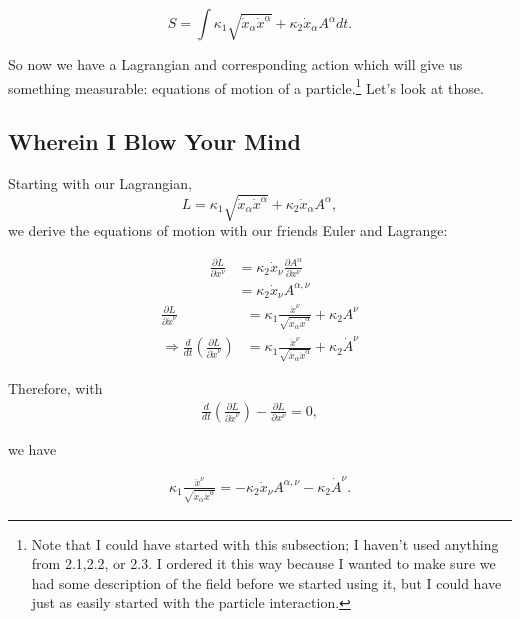 \documentclass[11pt]{article}
\begin{document}
\begin{equation}\label{eq:particle_act}
S = \int\kappa_1 \sqrt{\dot{x}_\alpha\dot{x}^\alpha} + \kappa_2 \dot{x}_\alpha A^\alpha dt.
\end{equation}

So now we have a Lagrangian and corresponding action which will give us something measurable: equations of motion of a particle.\footnote{Note that I could have started with this subsection; I haven't used anything from 2.1,2.2, or 2.3.  I ordered it this way because I wanted to make sure we had some description of the field before we started using it, but I could have just as easily started with the particle interaction.}  Let's look at those.

\subsection{Wherein I Blow Your Mind}
Starting with our Lagrangian,
\begin{equation}\label{eq:particle_lagr}
L = \kappa_1 \sqrt{\dot{x}_\alpha\dot{x}^\alpha} + \kappa_2 \dot{x}_\alpha A^\alpha,
\end{equation}
we derive the equations of motion with our friends Euler and Lagrange:

\begin{align}
\frac{\partial L}{\partial x^\nu} &= \kappa_2 \dot{x}_\nu\frac{\partial A^\alpha}{\partial x^\nu}\nonumber\\
&= \kappa_2 \dot{x}_\nu A^{\alpha,\nu}
\end{align}
\begin{align}
\frac{\partial L}{\partial \dot{x}^\nu} &= \kappa_1\frac{\dot{x}^\nu}{\sqrt{\dot{x}_\alpha\dot{x}^\alpha}} + \kappa_2 A^\nu\nonumber\\
\Rightarrow \frac{d}{dt}\left(\frac{\partial L}{\partial \dot{x}^\nu}\right) &=  \kappa_1\frac{\ddot{x}^\nu}{\sqrt{\dot{x}_\alpha\dot{x}^\alpha}} + \kappa_2 \dot{A}^\nu
\end{align}

Therefore, with
\begin{align}
\frac{d}{dt}\left(\frac{\partial L}{\partial \dot{x}^\nu}\right) - \frac{\partial L}{\partial x^\nu} = 0,
\end{align}

we have

\begin{align}\label{eq:almost_done}
\kappa_1\frac{\ddot{x}^\nu}{\sqrt{\dot{x}_\alpha\dot{x}^\alpha}} = -\kappa_2 \dot{x}_\nu A^{\alpha,\nu} - \kappa_2 \dot{A}^\nu.
\end{align}
\end{document}
